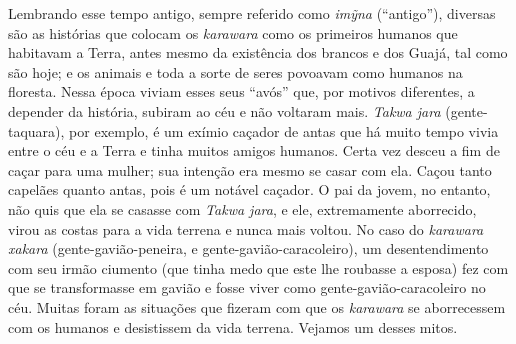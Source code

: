 Lembrando esse tempo antigo, sempre referido como \emph{imỹna}
(``antigo''), diversas são as histórias que colocam os \emph{karawara}
como os primeiros humanos que habitavam a Terra, antes mesmo da
existência dos brancos e dos Guajá, tal como são hoje; e os animais e
toda a sorte de seres povoavam como humanos na floresta. Nessa época
viviam esses seus ``avós'' que, por motivos diferentes, a depender da
história, subiram ao céu e não voltaram mais. \emph{Takwa jara}
(gente-taquara), por exemplo, é um exímio caçador de antas que há muito
tempo vivia entre o céu e a Terra e tinha muitos amigos humanos. Certa
vez desceu a fim de caçar para uma mulher; sua intenção era mesmo se
casar com ela. Caçou tanto capelães quanto antas, pois é um notável
caçador. O pai da jovem, no entanto, não quis que ela se casasse com
\emph{Takwa jara}, e ele, extremamente aborrecido, virou as costas para
a vida terrena e nunca mais voltou. No caso do \emph{karawara}
\emph{xakara} (gente-gavião-peneira, e gente-gavião-caracoleiro), um
desentendimento com seu irmão ciumento (que tinha medo que este lhe
roubasse a esposa) fez com que se transformasse em gavião e fosse viver
como gente-gavião-caracoleiro no céu. Muitas foram as situações que
fizeram com que os \emph{karawara} se aborrecessem com os humanos e
desistissem da vida terrena. Vejamos um desses mitos.

